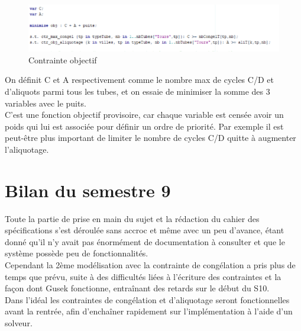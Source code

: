 \documentclass{polytech/polytech}
\numberwithin{figure}{chapter}
\begin{document}
\begin{figure}[ht]
    \centering
    \includegraphics[width=\textwidth]{pic/objectif.png}
    \caption{Contrainte objectif}
\end{figure}

On définit C et A respectivement comme le nombre max de cycles C/D et d'aliquots parmi tous les tubes, et on essaie de minimiser la somme des 3 variables avec le puits.\\
C'est une fonction objectif provisoire, car chaque variable est censée avoir un poids qui lui est associée pour définir un ordre de priorité. Par exemple il est peut-être plus important de limiter le nombre de cycles C/D quitte à augmenter l'\gls{aliquotage}.

\chapter{Bilan du semestre 9}

Toute la partie de prise en main du sujet et la rédaction du cahier des spécifications s'est déroulée sans accroc et même avec un peu d'avance, étant donné qu'il n'y avait pas énormément de documentation à consulter et que le système possède peu de fonctionnalités.\\
Cependant la 2ème modélisation avec la contrainte de congélation a pris plus de temps que prévu, suite à des difficultés liées à l'écriture des contraintes et la façon dont Gusek fonctionne, entraînant des retards sur le début du S10.\\
Dans l'idéal les contraintes de congélation et d'\gls{aliquotage} seront fonctionnelles avant la rentrée, afin d'enchaîner rapidement sur l'implémentation à l'aide d'un solveur.
\end{document}
